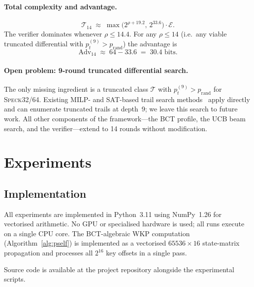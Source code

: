 \documentclass[runningheads]{llncs}
\newcommand{\speck}{\textsc{Speck}32/64}
\begin{document}
\paragraph{Total complexity and advantage.}

\begin{equation}
  \label{eq:time14-total}
  \mathcal{T}_{14}
  \;\approx\;
  \max\!\bigl(2^{\rho+19.2},\,2^{33.6}\bigr) \cdot \mathcal{E}.
\end{equation}
The verifier dominates whenever $\rho \le 14.4$.  For any
$\rho \le 14$ (i.e.\ any viable truncated differential with
$p_t^{(9)} > p_\mathrm{rand}$) the advantage is
\begin{equation}
  \label{eq:adv14}
  \mathrm{Adv}_{14}
  \;\approx\; 64 - 33.6 \;=\; 30.4 \text{ bits.}
\end{equation}

\paragraph{Open problem: 9-round truncated differential search.}

The only missing ingredient is a truncated class $\mathcal{T}$ with
$p_t^{(9)} > p_\mathrm{rand}$ for \speck{}.  Existing MILP-
and SAT-based trail search methods~\cite{ALLW14} apply directly and
can enumerate truncated trails at depth~9; we leave this search to
future work.  All other components of the framework---the BCT
profile, the UCB beam search, and the verifier---extend to 14 rounds
without modification.

\section{Experiments}
\label{sec:experiments}

\subsection{Implementation}

All experiments are implemented in Python~3.11 using NumPy~1.26 for
vectorised arithmetic.  No GPU or specialised hardware is used; all
runs execute on a single CPU core.  The BCT-algebraic WKP computation
(Algorithm~\ref{alg:pself}) is implemented as a vectorised $65536 \times
16$ state-matrix propagation and processes all $2^{16}$ key offsets in a
single pass.

Source code is available at the project repository alongside the
experimental scripts.
\end{document}
